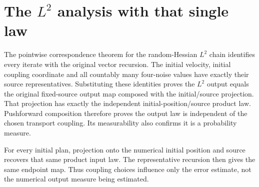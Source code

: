 \documentclass[11pt,a4paper]{article}
\begin{document}
\section{\texorpdfstring{The \(L^{2}\) analysis with that single law}{The L² analysis with that single law}}


The pointwise correspondence theorem for the random-Hessian \(L^{2}\) chain identifies every iterate with the original vector recursion. The initial velocity, initial coupling coordinate and all countably many four-noise values have exactly their source representatives. Substituting these identities proves the \(L^{2}\) output equals the original fixed-source output map composed with the initial/\allowbreak{}source projection. That projection has exactly the independent initial-position/\allowbreak{}source product law. Pushforward composition therefore proves the output law is independent of the chosen transport coupling. Its measurability also confirms it is a probability measure.



For every initial plan, projection onto the numerical initial position and source recovers that same product input law. The representative recursion then gives the same endpoint map. Thus coupling choices influence only the error estimate, not the numerical output measure being estimated.
\end{document}
